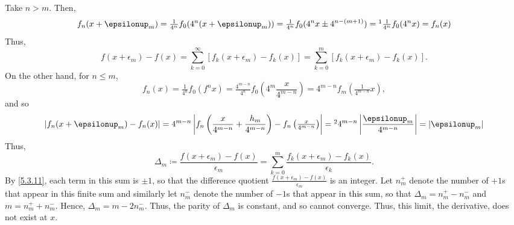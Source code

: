 \begin{exm}
Take $n>m$.  Then,
\begin{equation}
f_n(x+\epsilon _m)=\tfrac{1}{4^n}f_0(4^n(x+\epsilon _m))=\tfrac{1}{4^n}f_0(4^nx\pm 4^{n-(m+1)})=\footnote{Because $f_0$ has period $1$ and $n\geq m+1$.}\tfrac{1}{4^n}f_0(4^nx)=f_n(x)
\end{equation}
Thus,
\begin{equation}
f(x+\epsilon _m)-f(x)=\sum _{k=0}^\infty [f_k(x+\epsilon _m)-f_k(x)]=\sum _{k=0}^m[f_k(x+\epsilon _m)-f_k(x)].
\end{equation}
On the other hand, for $n\leq m$,
\begin{equation}
f_n(x)=\tfrac{1}{4^n}f_0(f^nx)=\tfrac{4^{m-n}}{4^n}f_0\left( 4^m\frac{x}{4^{m-n}}\right) =4^{m-n}f_m(\tfrac{1}{4^{m-n}}x),
\end{equation}
and so
\begin{equation}\label{5.3.11}
\left| f_n(x+\epsilon _m)-f_n(x)\right| =4^{m-n}\left| f_n\left( \frac{x}{4^{m-n}}+\frac{h_m}{4^{m-n}}\right) -f_n\left( \tfrac{x}{4^{m-n}}\right) \right| =\footnote{Because, for $n\leq m$, $\abs{\frac{\epsilon _m}{4^{m-n}}}\leq \abs{\epsilon _m}$.}4^{m-n}\left| \frac{\epsilon _m}{4^{m-n}}\right|=\abs{\epsilon _m}
\end{equation}
Thus,
\begin{equation}
\Delta _m\coloneqq \frac{f(x+\epsilon _m)-f(x)}{\epsilon _m}=\sum _{k=0}^m\frac{f_k(x+\epsilon _m)-f_k(x)}{\epsilon _k}.
\end{equation}
By \eqref{5.3.11}, each term in this sum is $\pm 1$, so that the difference quotient $\frac{f(x+\epsilon _m)-f(x)}{\epsilon _m}$ is an integer.  Let $n_m^+$ denote the number of $+1$s that appear in this finite sum and similarly let $n_m^-$ denote the number of $-1$s that appear in this sum, so that $\Delta _m=n_m^+-n_m^-$ and $m=n_m^++n_m^-$.  Hence, $\Delta _m=m-2n_m^-$.  Thus, the parity of $\Delta _m$ is constant, and so cannot converge.  Thus, this limit, the derivative, does not exist at $x$.
\end{exm}

